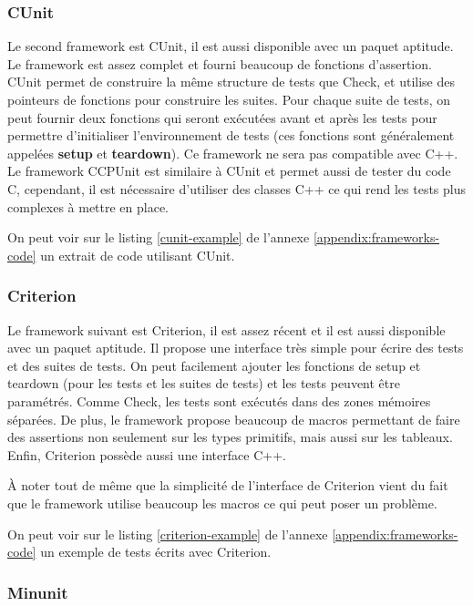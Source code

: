 \documentclass[a4paper]{article}
\begin{document}
\subsubsection*{CUnit}

Le second framework est CUnit, il est aussi disponible avec un paquet aptitude.
Le framework est assez complet et fourni beaucoup de fonctions d'assertion.
CUnit permet de construire la même structure de tests que Check, et utilise des
pointeurs de fonctions pour construire les suites. Pour chaque suite de tests,
on peut fournir deux fonctions qui seront exécutées avant et après les tests
pour permettre d'initialiser l'environnement de tests (ces fonctions sont
généralement appelées \textbf{setup} et \textbf{teardown}). Ce framework ne sera
pas compatible avec C++. Le framework CCPUnit est similaire à CUnit et permet
aussi de tester du code C, cependant, il est nécessaire d'utiliser des classes
C++ ce qui rend les tests plus complexes à mettre en place.

On peut voir sur le listing \ref{cunit-example} de l'annexe
\ref{appendix:frameworks-code} un extrait de code utilisant CUnit.

\subsubsection*{Criterion}

Le framework suivant est Criterion, il est assez récent et il est aussi
disponible avec un paquet aptitude. Il propose une interface très simple pour
écrire des tests et des suites de tests. On peut facilement ajouter les
fonctions de setup et teardown (pour les tests et les suites de tests) et les
tests peuvent être paramétrés. Comme Check, les tests sont exécutés dans des
zones mémoires séparées. De plus, le framework propose beaucoup de macros
permettant de faire des assertions non seulement sur les types primitifs, mais
aussi sur les tableaux. Enfin, Criterion possède aussi une interface C++.

À noter tout de même que la simplicité de l'interface de Criterion vient du fait
que le framework utilise beaucoup les macros ce qui peut poser un problème.

On peut voir sur le listing \ref{criterion-example} de l'annexe
\ref{appendix:frameworks-code} un exemple de tests écrits avec Criterion.

\subsubsection*{Minunit}
\end{document}
